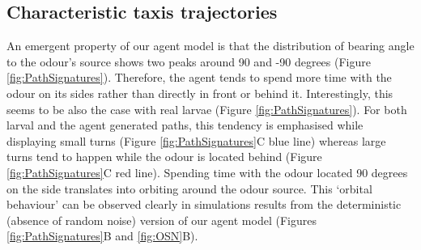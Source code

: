 \documentclass[11pt,a4paper]{article}
\begin{document}
\subsection{Characteristic taxis trajectories}
An emergent property of our agent model is that the distribution of bearing angle to the odour's source shows two peaks around 90 and -90 degrees (Figure \ref{fig:PathSignatures}). Therefore, the agent tends to spend more time with the odour on its sides rather than directly in front or behind it. Interestingly, this seems to be also the case with real larvae (Figure \ref{fig:PathSignatures}). For both  larval and the agent generated paths, this tendency is emphasised while displaying small turns (Figure \ref{fig:PathSignatures}C blue line) whereas large turns tend to happen while the odour is located behind (Figure \ref{fig:PathSignatures}C red line). Spending time with the odour located 90 degrees on the side translates into orbiting around the odour source. This ‘orbital behaviour’ can be observed clearly in simulations results from the deterministic (absence of random noise) version of our agent model (Figures \ref{fig:PathSignatures}B and \ref{fig:OSN}B).
\end{document}
